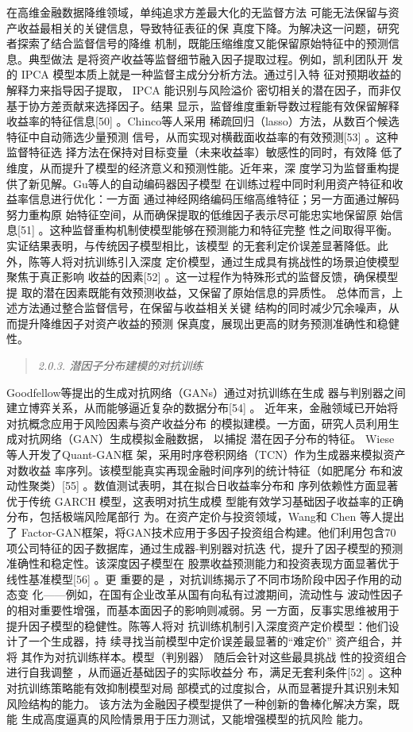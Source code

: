 在高维金融数据降维领域，单纯追求方差最大化的无监督方法
可能无法保留与资产收益最相关的关键信息，导致特征表征的保
真度下降。为解决这一问题，研究者探索了结合监督信号的降维
机制，既能压缩维度又能保留原始特征中的预测信息。典型做法
是将资产收益等监督细节融入因子提取过程。例如，凯利团队开 发的 IPCA
模型本质上就是一种监督主成分分析方法。通过引入特
征对预期收益的解释力来指导因子提取， IPCA 能识别与风险溢价
密切相关的潜在因子，而非仅基于协方差贡献来选择因子。结果
显示，监督维度重新导数过程能有效保留解释收益率的特征信息{[}50{]}
。Chinco等人采用
稀疏回归（lasso）方法，从数百个候选特征中自动筛选少量预测
信号，从而实现对横截面收益率的有效预测{[}53{]} 。这种监督特征选
择方法在保持对目标变量（未来收益率）敏感性的同时，有效降
低了维度，从而提升了模型的经济意义和预测性能。近年来，深
度学习为监督重构提供了新见解。Gu等人的自动编码器因子模型
在训练过程中同时利用资产特征和收益率信息进行优化：一方面
通过神经网络编码压缩高维特征；另一方面通过解码努力重构原
始特征空间，从而确保提取的低维因子表示尽可能忠实地保留原 始信息{[}51{]}
。这种监督重构机制使模型能够在预测能力和特征完整
性之间取得平衡。实证结果表明，与传统因子模型相比，该模型
的无套利定价误差显著降低。此外，陈等人将对抗训练引入深度
定价模型，通过生成具有挑战性的场景迫使模型聚焦于真正影响
收益的因素{[}52{]} 。这一过程作为特殊形式的监督反馈，确保模型提
取的潜在因素既能有效预测收益，又保留了原始信息的异质性。
总体而言，上述方法通过整合监督信号，在保留与收益相关关键
结构的同时减少冗余噪声，从而提升降维因子对资产收益的预测
保真度，展现出更高的财务预测准确性和稳健性。

\begin{quote}
\emph{2.0.3. 潜因子分布建模的对抗训练}
\end{quote}

Goodfellow等提出的生成对抗网络（GANs）通过对抗训练在生成
器与判别器之间建立博弈关系，从而能够逼近复杂的数据分布{[}54{]} 。
近年来，金融领域已开始将对抗概念应用于风险因素与资产收益分布
的模拟建模。一方面，研究人员利用生成对抗网络（GAN）生成模拟金融数据，
以捕捉 潜在因子分布的特征。 Wiese 等人开发了Quant-GAN框
架，采用时序卷积网络（TCN）作为生成器来模拟资产对数收益
率序列。该模型能真实再现金融时间序列的统计特征（如肥尾分
布和波动性聚类）{[}55{]} 。数值测试表明，其在拟合日收益率分布和
序列依赖性方面显著优于传统 GARCH 模型，这表明对抗生成模
型能有效学习基础因子收益率的正确分布，包括极端风险尾部行
为。在资产定价与投资领域，Wang和 Chen 等人提出了
Factor-GAN框架，将GAN技术应用于多因子投资组合构建。他们利用包含70项公司特征的因子数据库，通过生成器-判别器对抗迭
代，提升了因子模型的预测准确性和稳定性。该深度因子模型在
股票收益预测能力和投资表现方面显著优于线性基准模型{[}56{]} 。更 重要的是
，对抗训练揭示了不同市场阶段中因子作用的动态变
化------例如，在国有企业改革从国有向私有过渡期间，流动性与
波动性因子的相对重要性增强，而基本面因子的影响则减弱。另
一方面，反事实思维被用于提升因子模型的稳健性。陈等人将对
抗训练机制引入深度资产定价模型：他们设计了一个生成器，持
续寻找当前模型中定价误差最显著的``难定价'' 资产组合，并将
其作为对抗训练样本。模型（判别器） 随后会针对这些最具挑战
性的投资组合进行自我调整 ，从而逼近基础因子的实际收益分
布，满足无套利条件{[}52{]} 。这种对抗训练策略能有效抑制模型对局
部模式的过度拟合，从而显著提升其识别未知风险结构的能力。
该方法为金融因子模型提供了一种创新的鲁棒化解决方案，既能
生成高度逼真的风险情景用于压力测试，又能增强模型的抗风险 能力。

